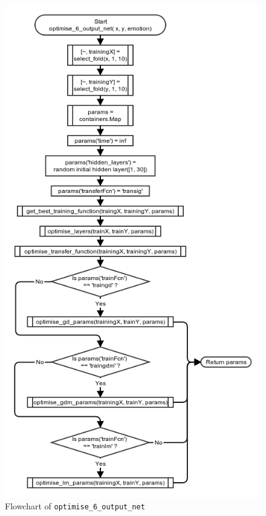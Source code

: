 \documentclass[10pt,a4paper]{article}
\begin{document}
\begin{figure}[!ht]
	\centering
	\includegraphics[scale=0.7]{images/flow_chart/optimise_6_output_net.png}
	\caption{Flowchart of \tt{optimise\_6\_output\_net}}
	\label{fig:optimise_6_output_net}
\end{figure}
\end{document}
